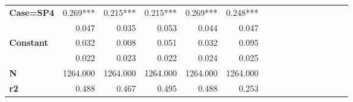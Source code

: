 \begin{tabular}{@{\extracolsep{5pt}}lrrrrrrrrrrrrrrr}
{\bf Case=SP4} & 0.269\phantom{)}*** & 0.215\phantom{)}*** & 0.215\phantom{)}*** & 0.269\phantom{)}*** & 0.248\phantom{)}*** \\
{\bf } & 0.047\phantom{\phantom{)}***} & 0.035\phantom{\phantom{)}***} & 0.053\phantom{\phantom{)}***} & 0.044\phantom{\phantom{)}***} & 0.047\phantom{\phantom{)}***} \\
{\bf Constant} & 0.032\phantom{\phantom{)}***} & 0.008\phantom{\phantom{)}***} & 0.051\phantom{\phantom{)}***} & 0.032\phantom{\phantom{)}***} & 0.095\phantom{\phantom{)}***} \\
{\bf } & 0.022\phantom{\phantom{)}***} & 0.023\phantom{\phantom{)}***} & 0.022\phantom{\phantom{)}***} & 0.024\phantom{\phantom{)}***} & 0.025\phantom{\phantom{)}***} \\
\hline
{\bf N} & 1264.000\phantom{\phantom{)}***} & 1264.000\phantom{\phantom{)}***} & 1264.000\phantom{\phantom{)}***} & 1264.000\phantom{\phantom{)}***} & 1264.000\phantom{\phantom{)}***} \\
{\bf r2} & 0.488\phantom{\phantom{)}***} & 0.467\phantom{\phantom{)}***} & 0.495\phantom{\phantom{)}***} & 0.488\phantom{\phantom{)}***} & 0.253\phantom{\phantom{)}***} \\
\hline
\end{tabular}
